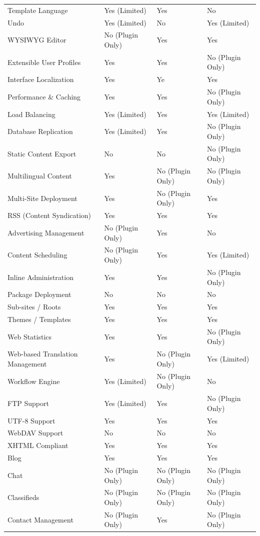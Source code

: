 \documentclass[12pt]{report}
\begin{document}
\begin{itemize}
\begin{longtable}[H]{|| p{.3\linewidth} | p{.19\linewidth} | p{.19\linewidth} | p{.19\linewidth} ||}
Template Language & Yes (Limited) & Yes & No \\
Undo & Yes (Limited) & No & Yes (Limited) \\
WYSIWYG Editor & No (Plugin Only) & Yes & Yes \\
Extensible User Profiles & Yes & Yes & No (Plugin Only) \\
Interface Localization & Yes & Ye & Yes \\
Performance \& Caching & Yes & Yes & No (Plugin Only) \\
Load Balancing & Yes (Limited) & Yes & Yes (Limited) \\
Database Replication & Yes (Limited) & Yes & No (Plugin Only) \\
Static Content Export & No & No & No (Plugin Only) \\
Multilingual Content & Yes & No (Plugin Only) & No (Plugin Only) \\
Multi-Site Deployment & Yes & No (Plugin Only) & Yes \\
RSS (Content Syndication) & Yes & Yes & Yes \\
Advertising Management & No (Plugin Only) & Yes & No \\
Content Scheduling & No (Plugin Only) & Yes & Yes (Limited) \\
Inline Administration & Yes & Yes & No (Plugin Only) \\
Package Deployment & No & No & No \\
Sub-sites / Roots & Yes & Yes & Yes \\
Themes / Templates & Yes & Yes & Yes \\
Web Statistics & Yes & Yes & No (Plugin Only) \\
Web-based Translation Management & Yes & No (Plugin Only) & Yes (Limited) \\
Workflow Engine & Yes (Limited) & No (Plugin Only) & No \\
FTP Support & Yes (Limited) & Yes & No (Plugin Only) \\
UTF-8 Support & Yes & Yes & Yes \\
WebDAV Support & No & No & No \\
XHTML Compliant & Yes & Yes & Yes \\
Blog & Yes & Yes & Yes \\
Chat & No (Plugin Only) & No (Plugin Only) & No (Plugin Only) \\
Classifieds & No (Plugin Only) & No (Plugin Only) & No (Plugin Only) \\
Contact Management & No (Plugin Only) & Yes & No (Plugin Only) \\

\end{longtable}
\end{itemize}
\end{document}
